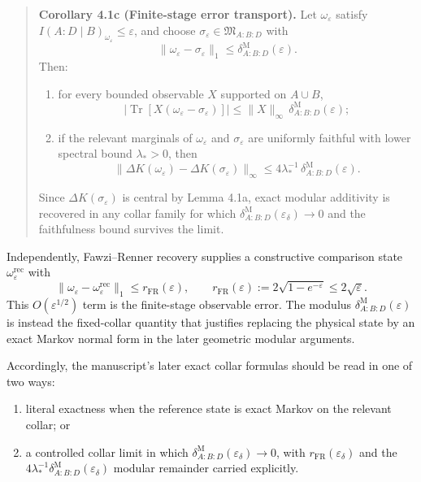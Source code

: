 \begin{quote}
\textbf{Corollary 4.1c (Finite-stage error transport).} Let \(\omega_\varepsilon\) satisfy \(I(A:D\mid B)_{\omega_\varepsilon}\le \varepsilon\), and choose \(\sigma_\varepsilon\in\mathfrak M_{A:B:D}\) with
\[
\|\omega_\varepsilon-\sigma_\varepsilon\|_1
\le
\delta^{\mathrm M}_{A:B:D}(\varepsilon).
\]
Then:
\begin{enumerate}
\item for every bounded observable \(X\) supported on \(A\cup B\),
\[
\left|
\operatorname{Tr}\!\left[X(\omega_\varepsilon-\sigma_\varepsilon)\right]
\right|
\le
\|X\|_\infty\,\delta^{\mathrm M}_{A:B:D}(\varepsilon);
\]
\item if the relevant marginals of \(\omega_\varepsilon\) and \(\sigma_\varepsilon\) are uniformly faithful with lower spectral bound \(\lambda_\ast>0\), then
\[
\|\Delta K(\omega_\varepsilon)-\Delta K(\sigma_\varepsilon)\|_\infty
\le
4\lambda_\ast^{-1}\,\delta^{\mathrm M}_{A:B:D}(\varepsilon).
\]
\end{enumerate}
Since \(\Delta K(\sigma_\varepsilon)\) is central by Lemma 4.1a, exact modular additivity is recovered in any collar family for which \(\delta^{\mathrm M}_{A:B:D}(\varepsilon_\delta)\to0\) and the faithfulness bound survives the limit.
\end{quote}

Independently, Fawzi--Renner recovery supplies a constructive comparison state \(\omega^{\mathrm{rec}}_\varepsilon\) with
\[
\|\omega_\varepsilon-\omega^{\mathrm{rec}}_\varepsilon\|_1
\le
r_{\mathrm{FR}}(\varepsilon),
\qquad
r_{\mathrm{FR}}(\varepsilon):=2\sqrt{1-e^{-\varepsilon}}\le 2\sqrt{\varepsilon}.
\]
This \(O(\varepsilon^{1/2})\) term is the finite-stage observable error. The modulus \(\delta^{\mathrm M}_{A:B:D}(\varepsilon)\) is instead the fixed-collar quantity that justifies replacing the physical state by an exact Markov normal form in the later geometric modular arguments.

Accordingly, the manuscript's later exact collar formulas should be read in one of two ways:
\begin{enumerate}
\item literal exactness when the reference state is exact Markov on the relevant collar; or
\item a controlled collar limit in which \(\delta^{\mathrm M}_{A:B:D}(\varepsilon_\delta)\to0\), with \(r_{\mathrm{FR}}(\varepsilon_\delta)\) and the \(4\lambda_\ast^{-1}\delta^{\mathrm M}_{A:B:D}(\varepsilon_\delta)\) modular remainder carried explicitly.
\end{enumerate}

